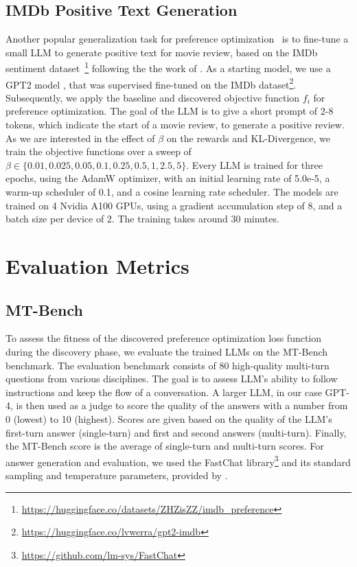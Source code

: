 \documentclass{article}
\theoremstyle{plain}
\theoremstyle{definition}
\theoremstyle{remark}
\begin{document}
\subsection{IMDb Positive Text Generation}
\label{imdb-training}
Another popular generalization task for preference optimization~\citep{rafailov2023direct} is to fine-tune a small LLM to generate positive text for movie review, based on the IMDb sentiment dataset~\citep{maas2011learning}\footnote{\href{https://huggingface.co/datasets/ZHZisZZ/imdb_preference}{https://huggingface.co/datasets/ZHZisZZ/imdb\_preference}} following the the work of \citet{zhou2024weak}. As a starting model, we use a GPT2 model \citep{radford2019language}, that was supervised fine-tuned on the IMDb dataset\footnote{\href{https://huggingface.co/lvwerra/gpt2-imdb}{https://huggingface.co/lvwerra/gpt2-imdb}}. Subsequently, we apply the baseline and discovered objective function $f_i$ for preference optimization. The goal of the LLM is to give a short prompt of 2-8 tokens, which indicate the start of a movie review, to generate a positive review. As we are interested in the effect of $\beta$ on the rewards and KL-Divergence, we train the objective functions over a sweep of $\beta \in \{0.01, 0.025, 0.05, 0.1, 0.25, 0.5, 1, 2.5, 5\}$. Every LLM is trained for three epochs, using the AdamW optimizer, with an initial learning rate of 5.0e-5, a warm-up scheduler of 0.1, and a cosine learning rate scheduler. The models are trained on 4 Nvidia A100 GPUs, using a gradient accumulation step of 8, and a batch size per device of 2. The training takes around 30 minutes.


\section{Evaluation Metrics}
\label{EvaluationMetrics}

\subsection{MT-Bench}
To assess the fitness of the discovered preference optimization loss function during the discovery phase, we evaluate the trained LLMs on the MT-Bench~\citep{zheng2024judging} benchmark. The evaluation benchmark consists of 80 high-quality multi-turn questions from various disciplines. The goal is to assess LLM's ability to follow instructions and keep the flow of a conversation. A larger LLM, in our case GPT-4, is then used as a judge to score the quality of the answers with a number from 0 (lowest) to 10 (highest). Scores are given based on the quality of the LLM's first-turn answer (single-turn) and first and second answers (multi-turn). Finally, the MT-Bench score is the average of single-turn and multi-turn scores. For answer generation and evaluation, we used the FastChat library\footnote{\href{https://github.com/lm-sys/FastChat}{https://github.com/lm-sys/FastChat}} and its standard sampling and temperature parameters, provided by \citet{zheng2024judging}.
\end{document}
